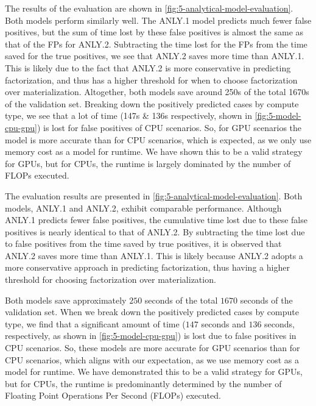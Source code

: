 The results of the evaluation are shown in \autoref{fig:5-analytical-model-evaluation}. Both models perform similarly well. The ANLY.1 model predicts much fewer false positives, but the sum of time lost by these false positives is almost the same as that of the FPs for ANLY.2. Subtracting the time lost for the FPs from the time saved for the true positives, we see that ANLY.2 saves more time than ANLY.1. This is likely due to the fact that ANLY.2 is more conservative in predicting factorization, and thus has a higher threshold for when to choose factorization over materialization. Altogether, both models save around 250s of the total 1670s of the validation set. Breaking down the positively predicted cases by compute type, we see that a lot of time (147s \& 136s respectively, shown in \autoref{fig:5-model-cpu-gpu}) is lost for false positives of CPU scenarios. So, for GPU scenarios the model is more accurate than for CPU scenarios, which is expected, as we only use memory cost as a model for runtime. We have shown this to be a valid strategy for GPUs, but for CPUs, the runtime is largely dominated by the number of FLOPs executed.

The evaluation results are presented in \autoref{fig:5-analytical-model-evaluation}. Both models, ANLY.1 and ANLY.2, exhibit comparable performance. Although ANLY.1 predicts fewer false positives, the cumulative time lost due to these false positives is nearly identical to that of ANLY.2. By subtracting the time lost due to false positives from the time saved by true positives, it is observed that ANLY.2 saves more time than ANLY.1. This is likely because ANLY.2 adopts a more conservative approach in predicting factorization, thus having a higher threshold for choosing factorization over materialization.

Both models save approximately $250$ seconds of the total $1670$ seconds of the validation set. When we break down the positively predicted cases by compute type, we find that a significant amount of time ($147$ seconds and $136$ seconds, respectively, as shown in \autoref{fig:5-model-cpu-gpu}) is lost due to false positives in CPU scenarios. So, these models are more accurate for GPU scenarios than for CPU scenarios, which aligns with our expectation, as we use memory cost as a model for runtime. We have demonstrated this to be a valid strategy for GPUs, but for CPUs, the runtime is predominantly determined by the number of Floating Point Operations Per Second (FLOPs) executed.

